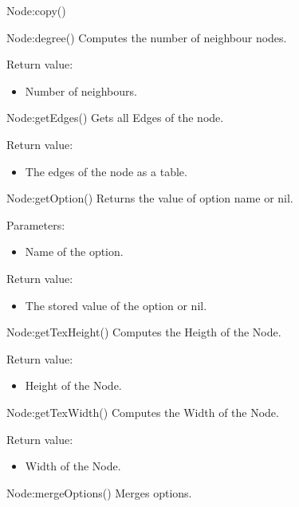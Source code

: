 \begin{luacommand}{{Node:copy}()}
\end{luacommand}\begin{luacommand}{{Node:degree}()}
Computes the number of neighbour nodes.


Return value:
\begin{itemize} \item[] Number of neighbours. \end{itemize}


\end{luacommand}\begin{luacommand}{{Node:getEdges}()}
Gets all Edges of the node.


Return value:
\begin{itemize} \item[] The edges of the node as a table. \end{itemize}


\end{luacommand}\begin{luacommand}{{Node:getOption}()}
Returns the value of option name or nil.

Parameters:
\begin{itemize}
	\item[]  \subitem Name of the option.
\end{itemize}


Return value:
\begin{itemize} \item[] The stored value of the option or nil. \end{itemize}


\end{luacommand}\begin{luacommand}{{Node:getTexHeight}()}
Computes the Heigth of the Node.


Return value:
\begin{itemize} \item[] Height of the Node. \end{itemize}


\end{luacommand}\begin{luacommand}{{Node:getTexWidth}()}
Computes the Width of the Node.


Return value:
\begin{itemize} \item[] Width of the Node. \end{itemize}


\end{luacommand}\begin{luacommand}{{Node:mergeOptions}()}
Merges options.


\end{luacommand}
